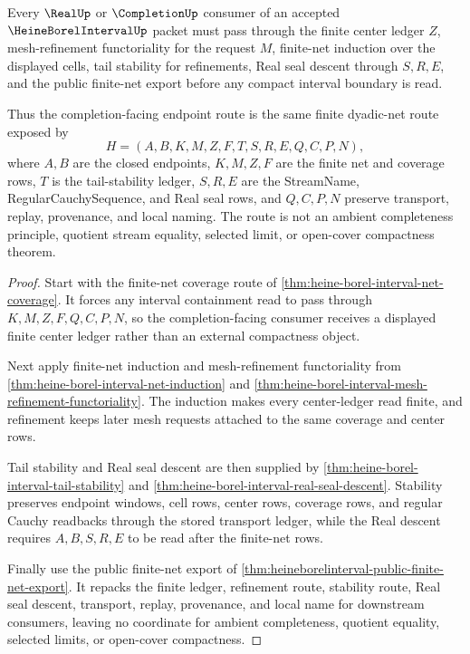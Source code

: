 \begin{theorem}
\label{thm:heine-borel-interval-real-completion-facing-route}
Every $\RealUp$ or $\CompletionUp$ consumer of an accepted $\HeineBorelIntervalUp$ packet must pass through the finite center ledger $Z$, mesh-refinement functoriality for the request $M$, finite-net induction over the displayed cells, tail stability for refinements, Real seal descent through $S,R,E$, and the public finite-net export before any compact interval boundary is read.

Thus the completion-facing endpoint route is the same finite dyadic-net route exposed by
$$
H=(A,B,K,M,Z,F,T,S,R,E,Q,C,P,N),
$$
where $A,B$ are the closed endpoints, $K,M,Z,F$ are the finite net and coverage rows, $T$ is the tail-stability ledger, $S,R,E$ are the StreamName, RegularCauchySequence, and Real seal rows, and $Q,C,P,N$ preserve transport, replay, provenance, and local naming. The route is not an ambient completeness principle, quotient stream equality, selected limit, or open-cover compactness theorem.
\end{theorem}
\begin{proof}
Start with the finite-net coverage route of \autoref{thm:heine-borel-interval-net-coverage}. It forces any interval containment read to pass through $K,M,Z,F,Q,C,P,N$, so the completion-facing consumer receives a displayed finite center ledger rather than an external compactness object.

Next apply finite-net induction and mesh-refinement functoriality from \autoref{thm:heine-borel-interval-net-induction} and \autoref{thm:heine-borel-interval-mesh-refinement-functoriality}. The induction makes every center-ledger read finite, and refinement keeps later mesh requests attached to the same coverage and center rows.

Tail stability and Real seal descent are then supplied by \autoref{thm:heine-borel-interval-tail-stability} and \autoref{thm:heine-borel-interval-real-seal-descent}. Stability preserves endpoint windows, cell rows, center rows, coverage rows, and regular Cauchy readbacks through the stored transport ledger, while the Real descent requires $A,B,S,R,E$ to be read after the finite-net rows.

Finally use the public finite-net export of \autoref{thm:heineborelinterval-public-finite-net-export}. It repacks the finite ledger, refinement route, stability route, Real seal descent, transport, replay, provenance, and local name for downstream consumers, leaving no coordinate for ambient completeness, quotient equality, selected limits, or open-cover compactness.
\end{proof}

